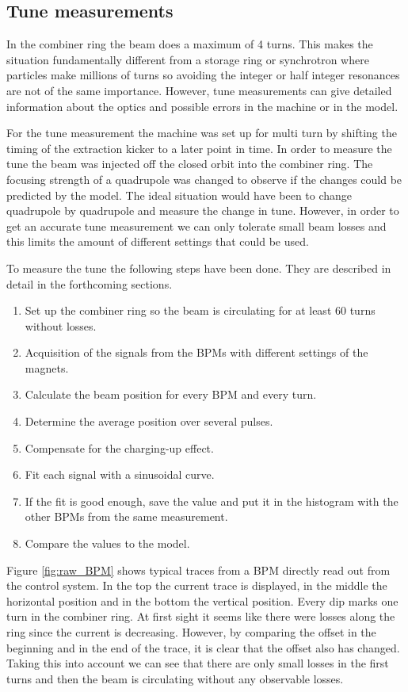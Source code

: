 \subsection{Tune measurements}

In the combiner ring the beam does a maximum of 4 turns. This makes the situation fundamentally different from a storage ring or synchrotron where particles make millions of turns so avoiding the integer or half integer resonances are not of the same importance. However, tune measurements can give detailed information about the optics and possible errors in the machine or in the model.

For the tune measurement the machine was set up for multi turn by shifting the timing of the extraction kicker to a later point in time. In order to measure the tune the beam was injected off the closed orbit into the combiner ring. The focusing strength of a quadrupole was changed to observe if the changes could be predicted by the model. The ideal situation would have been to change quadrupole by quadrupole and measure the change in tune. However, in order to get an accurate tune measurement we can only tolerate small beam losses and this limits the amount of different settings that could be used.


To measure the tune the following steps have been done. They are described in detail in the forthcoming sections.
\begin{enumerate}
\item
Set up the combiner ring so the beam is circulating for at least 60 turns without losses.
\item
Acquisition of the signals from the BPMs with different settings of the magnets.
\item
Calculate the beam position for every BPM and every turn.
\item
Determine the average position over several pulses.
\item
Compensate for the charging-up effect.
\item
Fit each signal with a sinusoidal curve.
\item
If the fit is good enough, save the value and put it in the histogram with the other BPMs from the same measurement.
\item
Compare the values to the model.
\end{enumerate}


 
Figure \ref{fig:raw_BPM} shows typical traces from a BPM directly read out from the control system. In the top the current trace is displayed, in the middle the horizontal position and in the bottom the vertical position. Every dip marks one turn in the combiner ring. At first sight it seems like there were losses along the ring since the current is decreasing. However, by comparing the offset in the beginning and in the end of the trace, it is clear that the offset also has changed. Taking this into account we can see that there are only small losses in the first turns and then the beam is circulating without any observable losses.


